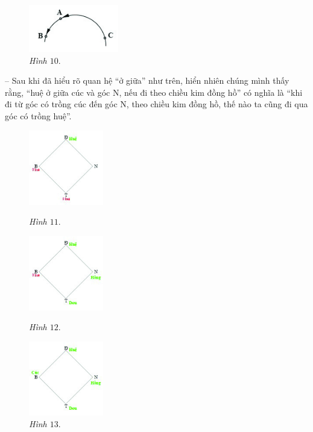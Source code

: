 	\vskip 0.1cm
	\begin{figure}
		\centering
		\vspace*{-10pt}
		\captionsetup{labelformat= empty, justification=centering}
		\includegraphics[width=0.35\textwidth]{pic10}
		\caption{\small\textit{Hình $10.$}}
		\vspace*{-10pt}
	\end{figure}
	-- Sau khi đã hiểu rõ quan hệ “ở giữa” như trên, hiển nhiên chúng mình thấy rằng, “huệ ở giữa cúc và góc N, nếu đi theo chiều kim đồng hồ” có nghĩa là “khi đi từ góc có trồng cúc đến góc N, theo chiều kim đồng hồ, thế nào ta cũng đi qua góc có trồng huệ”. 
	\vskip 0.1cm
	\begin{figure}
		\vspace*{-25pt}
		\centering
		\captionsetup{labelformat=empty, justification=centering}
		\hspace*{-7pt}\includegraphics[width= 0.29\textwidth]{pic11}
		
		\vspace*{-5pt}
		\caption{\textit{\small Hình $11.$}}
		\hspace*{-7pt}\includegraphics[width= 0.29\textwidth]{pic12}
		
		\vspace*{-10pt}
		\caption{\textit{\small Hình $12.$}}
		\vspace*{-25pt}
		
		\hspace*{-7pt}\includegraphics[width= 0.29\textwidth]{pic13}
		
		\vspace*{-15pt}
		\caption{\textit{\small Hình $13.$}}
		\vspace*{-25pt}
	\end{figure}
